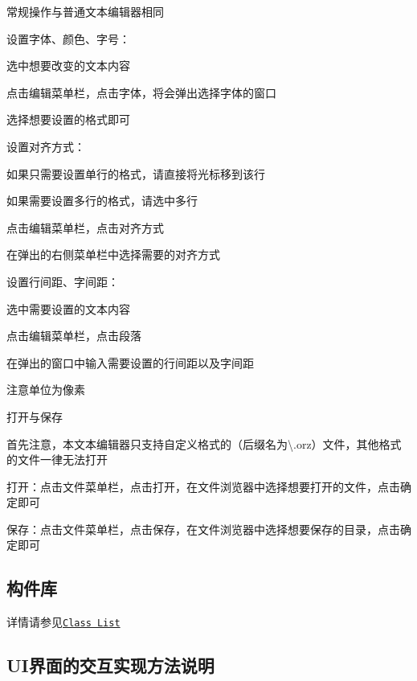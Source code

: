 \begin{DoxyEnumerate}
\item 常规操作与普通文本编辑器相同
\item 设置字体、颜色、字号：
\begin{DoxyItemize}
\item 选中想要改变的文本内容
\item 点击编辑菜单栏，点击字体，将会弹出选择字体的窗口
\item 选择想要设置的格式即可
\end{DoxyItemize}
\item 设置对齐方式：
\begin{DoxyItemize}
\item 如果只需要设置单行的格式，请直接将光标移到该行
\item 如果需要设置多行的格式，请选中多行
\item 点击编辑菜单栏，点击对齐方式
\item 在弹出的右侧菜单栏中选择需要的对齐方式
\end{DoxyItemize}
\item 设置行间距、字间距：
\begin{DoxyItemize}
\item 选中需要设置的文本内容
\item 点击编辑菜单栏，点击段落
\item 在弹出的窗口中输入需要设置的行间距以及字间距
\item 注意单位为像素
\end{DoxyItemize}
\item 打开与保存
\begin{DoxyItemize}
\item 首先注意，本文本编辑器只支持自定义格式的（后缀名为{\ttfamily \textbackslash{}.orz}）文件，其他格式的文件一律无法打开
\item 打开：点击文件菜单栏，点击打开，在文件浏览器中选择想要打开的文件，点击确定即可
\item 保存：点击文件菜单栏，点击保存，在文件浏览器中选择想要保存的目录，点击确定即可
\end{DoxyItemize}
\end{DoxyEnumerate}

\subsection*{构件库 }

详情请参见\href{annotated.html}{\tt Class List}

\subsection*{U\+I界面的交互实现方法说明 }


